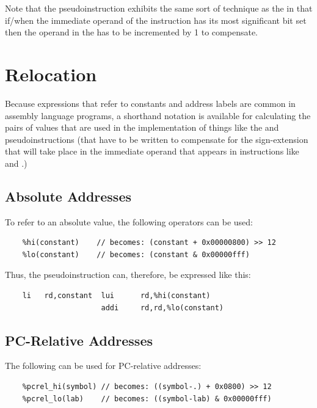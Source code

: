 Note that the \verb@la@ pseudoinstruction exhibits the same sort of technique as
the \verb@li@ in that
if/when the immediate operand of the \verb@addi@ instruction has its most significant
bit set then the operand in the \verb@auipc@ has to be incremented by 1 to compensate.








\section{Relocation}

Because expressions that refer to constants and address labels are common in
assembly language programs, a shorthand notation is available for calculating
the pairs of values that are used in the implementation of things like the
\verb@li@ and \verb@la@ pseudoinstructions (that have to be written to
compensate for the sign-extension that will take place in the immediate operand
that appears in instructions like \verb@addi@ and \verb@jalr@.)

\subsection{Absolute Addresses}

To refer to an absolute value, the following operators can be used:
{\small
\begin{verbatim}
    %hi(constant)    // becomes: (constant + 0x00000800) >> 12
    %lo(constant)    // becomes: (constant & 0x00000fff)
\end{verbatim}
}

Thus, the \verb@li@ pseudoinstruction can, therefore, be expressed like this:

{\small
\begin{verbatim}
    li   rd,constant  lui      rd,%hi(constant)
                      addi     rd,rd,%lo(constant)
\end{verbatim}
}



\subsection{PC-Relative Addresses}

The following can be used for PC-relative addresses:
{\small
\begin{verbatim}
    %pcrel_hi(symbol) // becomes: ((symbol-.) + 0x0800) >> 12
    %pcrel_lo(lab)    // becomes: ((symbol-lab) & 0x00000fff)
\end{verbatim}
}

